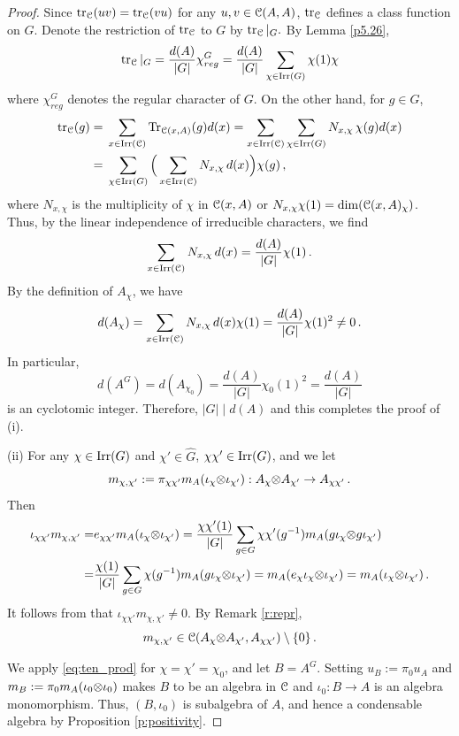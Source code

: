\documentclass{amsart}
\begin{document}
\begin{proof}
Since $\operatorname{tr}_{\EuScript{C}}(uv) = \operatorname{tr}_{\EuScript{C}}(vu)$ for any $u,v \in {\EuScript{C}}(A,A)$, $\operatorname{tr}_{\EuScript{C}}$ defines a class function on $G$. Denote the restriction of  $\operatorname{tr}_{\EuScript{C}}$ to $G$ by $\operatorname{tr}_{\EuScript{C}}|_G.$
By Lemma \ref{p5.26}, 
$$
\operatorname{tr}_{\EuScript{C}}|_G = \frac{d(A)}{|G|} \chi^G_{reg} = \frac{d(A)}{|G|} \sum_{\chi \in \operatorname{Irr}(G)} \chi(1)\chi
$$
where $\chi^G_{reg}$ denotes the regular character of $G$. On the other hand, for $g \in G$,
\begin{align*}
 \operatorname{tr}_{\EuScript{C}}(g) &=\, \sum_{x \in \operatorname{Irr}({\EuScript{C}})} \operatorname{Tr}_{{\EuScript{C}}(x,A)}(g) d(x) = \sum_{x \in \operatorname{Irr}({\EuScript{C}})}\sum_{\chi \in \operatorname{Irr}(G)} N_{x,\chi}\,\chi(g) d(x) \\
 & =\, \sum_{\chi \in \operatorname{Irr}(G)} \Big(\sum_{x \in \operatorname{Irr}({\EuScript{C}})} N_{x,\chi}\, d(x)\Big) \chi(g)\,,
\end{align*}
where $N_{x, \chi}$ is the multiplicity of $\chi$ in ${\EuScript{C}}(x,A)$ or $N_{x,\chi}\chi(1) = \dim({\EuScript{C}}(x,A)_\chi)$. Thus, by the linear independence of irreducible characters, we find
$$
\sum_{x \in \operatorname{Irr}({\EuScript{C}})} N_{x,\chi}\, d(x) = \frac{d(A)}{|G|}\chi(1)\,.
$$
By the definition of $A_\chi$, we have
$$
d(A_\chi) = \sum_{x \in \operatorname{Irr}({\EuScript{C}})} N_{x,\chi} \,d(x)\chi(1) = \frac{d(A)}{|G|}\chi(1)^2 \ne 0\,.
$$
In particular,
$$
d(A^G )= d(A_{\chi_0}) =  \frac{d(A)}{|G|}\chi_0(1)^2 = \frac{d(A)}{|G|} 
$$
 is an cyclotomic integer. Therefore, $|G|\mid d(A)$ and  this completes the proof of (i).

(ii) For any $\chi \in \operatorname{Irr}(G)$ and $\chi' \in \hat{G}$,   $\chi\chi' \in \operatorname{Irr}(G)$, and we let
$$
m_{\chi, \chi'}:= \pi_{\chi\chi'}m_A({\iota}_\chi {\otimes} {\iota}_{\chi'}) : A_\chi {\otimes} A_{\chi'} \to A_{\chi\chi'}\,.
$$
Then 
\begin{align*}
\iota_{\chi\chi'} m_{\chi, \chi'} =& e_{\chi\chi'} m_A({\iota}_\chi {\otimes} {\iota}_{\chi'})  = \frac{\chi\chi'(1)}{|G|}\sum_{g \in G} \chi\chi'(g^{-1})  m_A(g{\iota}_\chi {\otimes} g{\iota}_{\chi'}) \\
=& \frac{\chi(1)}{|G|}\sum_{g \in G} \chi(g^{-1}) m_A(g{\iota}_\chi {\otimes} {\iota}_{\chi'}) = m_A(e_\chi {\iota}_\chi {\otimes} {\iota}_{\chi'}) = m_A({\iota}_\chi {\otimes} {\iota}_{\chi'})\,.
\end{align*}
It follows from  \cite[Lemma 5.3]{DNRX2025} that $\iota_{\chi\chi'} m_{\chi, \chi'} \ne 0$. By Remark \ref{r:repr},
\begin{equation}\label{eq:ten_prod}
  m_{\chi, \chi'}\in {\EuScript{C}}(A_\chi {\otimes} A_{\chi'}, A_{\chi\chi'}) \setminus \{0\} \,.  
\end{equation}


We apply \eqref{eq:ten_prod} for $\chi = \chi'=\chi_0$, and let $B=A^G$.  Setting $u_B := \pi_0 u_A$ and $m_B: =\pi_0 m_A (\iota_0 {\otimes} \iota_0)$ makes $B$ to be an algebra in ${\EuScript{C}}$ and $\iota_0: B \to A$ is an algebra monomorphism. Thus, $(B, \iota_0)$ is subalgebra of $A$, and hence a condensable algebra by Proposition \ref{p:positivity}.


\end{proof}
\end{document}
